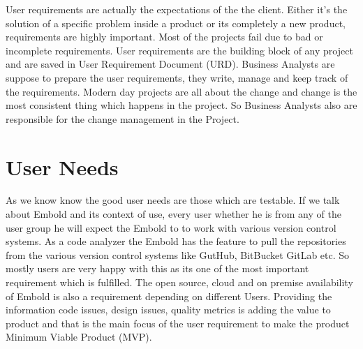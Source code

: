 User requirements are actually the expectations of the the client. Either it's the solution of a specific problem inside a product or its completely a new product, requirements are highly important. Most of the projects fail due to bad or incomplete requirements. User requirements are the building block of any project and are saved in User Requirement Document (URD). Business Analysts are suppose to prepare the user requirements, they write, manage and keep track of the requirements. Modern day projects are all about the change and change is the most consistent thing which happens in the project. So Business Analysts also are responsible for the change management in the Project.
\section{User Needs}
As we know know the good user needs are those which are testable. If we talk about Embold and its context of use, every user whether he is from any of the user group he will expect the Embold to to work with various version control systems. As a code analyzer the Embold has the feature to pull the repositories from the various version control systems like GutHub, BitBucket GitLab etc. So mostly users are very happy with this as its one of the most important requirement which is fulfilled. The open source, cloud and on premise availability of Embold is also a requirement depending on different Users. Providing the information code  issues, design issues, quality metrics is adding the value to product and that is the main focus of the user requirement to make the product Minimum Viable Product (MVP).

